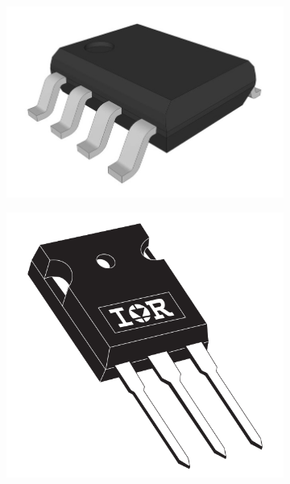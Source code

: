 \begin{figure}[h]
\begin{subfigure}
    \end{subfigure}
    \hspace{1em}
    \begin{subfigure}
        \centering
        \includegraphics[scale=0.3]{Imagenes/SOIC8.jpg}
    \end{subfigure}
    \hspace{1em}
    \begin{subfigure}
        \centering
        \includegraphics[scale=0.1]{Imagenes/IRFP150-TO247AC.png}
    \end{subfigure}

\end{figure}
